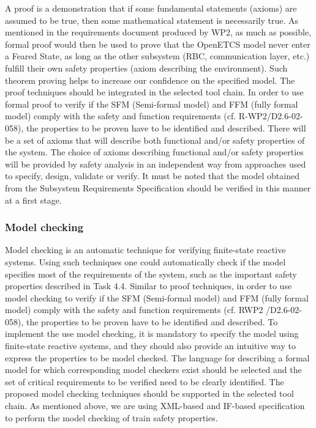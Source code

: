 \documentclass{template/openetcs_article}
\begin{document}
A proof is a demonstration that if some fundamental statements (axioms) are assumed to be true, then some mathematical statement is necessarily true. As mentioned in the requirements document produced by WP2, as much as possible, formal proof would then be used to prove that the OpenETCS model never enter a Feared State, as long as the other subsystem (RBC, communication layer, etc.) fulfill their own safety properties (axiom describing the environment). Such theorem proving helps to increase our confidence on the specified model.  The proof techniques should be integrated in the selected tool chain. In order to use formal proof to verify if the SFM (Semi-formal model) and FFM (fully formal model) comply with the safety and function requirements (cf. R-WP2/D2.6-02-058), the properties to be proven have to be identified and described. There will be a set of axioms that will describe both functional and/or safety properties of the system. The choice of axioms describing functional and/or safety properties will be provided by safety analysis in an independent way from approaches used to specify, design, validate or verify. It must be noted that the model obtained from the Subsystem Requirements Specification should be verified in this manner at a first stage.

\subsubsection{Model checking}

Model checking is an automatic technique for verifying finite-state reactive systems. Using such techniques one could automatically check if the model specifies most of the requirements of the system, such as the important safety properties described in Task 4.4. Similar to proof techniques, in order to use model checking to verify if the SFM (Semi-formal model) and FFM (fully formal model) comply with the safety and function requirements (cf. RWP2 /D2.6-02-058), the properties to be proven have to be identified and described. To implement the use model checking, it is mandatory to specify the model using finite-state reactive systems, and they should also provide an intuitive way to express the properties to be model checked. The language for describing a formal model for which corresponding model checkers exist should be selected and the set of critical requirements to be verified need to be clearly identified. The proposed model checking techniques should be supported in the selected tool chain. As mentioned above, we are using XML-based and IF-based specification to perform the model checking of train safety properties.
\end{document}
